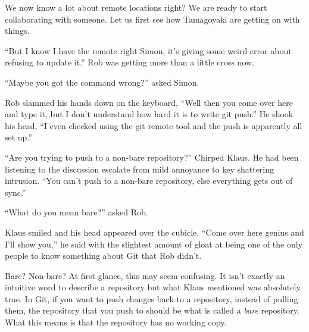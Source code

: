 We now know a lot about remote locations right?  We are ready to start collaborating with someone.  Let us first see how Tamagoyaki are getting on with things.

\begin{trenches}
``But I know I have the remote right Simon, it's giving some weird error about refusing to update it.''  Rob was getting more than a little cross now.  

``Maybe you got the command wrong?'' asked Simon.

Rob slammed his hands down on the keyboard, ``Well then you come over here and type it, but I don't understand how hard it is to write git push.''  He shook his head, ``I even checked using the git remote tool and the push is apparently all set up.''

``Are you trying to push to a non-bare repository?'' Chirped Klaus.  He had been listening to the discussion escalate from mild annoyance to key shattering intrusion.  ``You can't push to a non-bare repository, else everything gets out of sync.''

``What do you mean bare?'' asked Rob.

Klaus smiled and his head appeared over the cubicle.  ``Come over here genius and I'll show you,'' he said with the slightest amount of gloat at being one of the only people to know something about Git that Rob didn't.
\end{trenches}

Bare?  Non-bare?  At first glance, this may seem confusing.  It isn't exactly an intuitive word to describe a repository but what Klaus mentioned was absolutely true.  In Git, if you want to push changes back to a repository, instead of pulling them, the repository that you push to should be what is called a \emph{bare} repository.  What this means is that the repository has no working copy.

